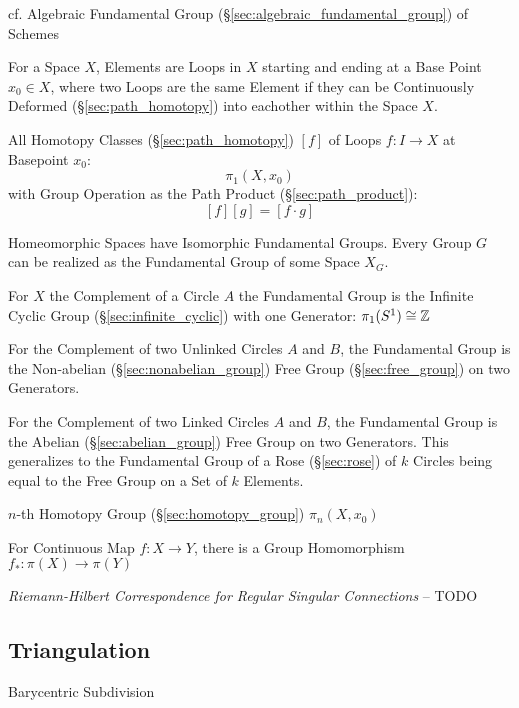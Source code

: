 cf. Algebraic Fundamental Group (\S\ref{sec:algebraic_fundamental_group}) of
Schemes

For a Space $X$, Elements are Loops in $X$ starting and ending at a
Base Point $x_0 \in X$, where two Loops are the same Element if they
can be Continuously Deformed (\S\ref{sec:path_homotopy}) into
eachother within the Space $X$.

All Homotopy Classes (\S\ref{sec:path_homotopy}) $[f]$ of Loops $f : I
\rightarrow X$ at Basepoint $x_0$:
\[
  \pi_1(X,x_0)
\]
with Group Operation as the Path Product (\S\ref{sec:path_product}):
\[
  [f][g] = [f \cdot g]
\]

Homeomorphic Spaces have Isomorphic Fundamental Groups. Every Group
$G$ can be realized as the Fundamental Group of some Space $X_G$.
\cite{hatcher02}

For $X$ the Complement of a Circle $A$ the Fundamental Group is the
Infinite Cyclic Group (\S\ref{sec:infinite_cyclic}) with one
Generator: $\pi_1(S^1) \cong \mathbb{Z}$

For the Complement of two Unlinked Circles $A$ and $B$, the
Fundamental Group is the Non-abelian (\S\ref{sec:nonabelian_group})
Free Group (\S\ref{sec:free_group}) on two Generators.

For the Complement of two Linked Circles $A$ and $B$, the Fundamental
Group is the Abelian (\S\ref{sec:abelian_group}) Free Group on two
Generators. \cite{hatcher02} This generalizes to the Fundamental Group
of a Rose (\S\ref{sec:rose}) of $k$ Circles being equal to the Free
Group on a Set of $k$ Elements.

$n$-th Homotopy Group (\S\ref{sec:homotopy_group}) $\pi_n(X,x_0)$

For Continuous Map $f : X \rightarrow Y$, there is a Group
Homomorphism $f_* : \pi (X) \rightarrow \pi (Y)$


\emph{Riemann-Hilbert Correspondence for Regular Singular Connections} -- TODO



\subsection{Triangulation}\label{sec:triangulation}

Barycentric Subdivision



